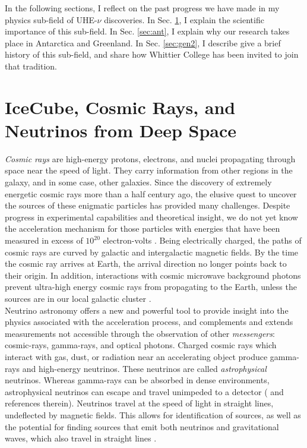 \documentclass[../../../main.tex]{subfiles}
\begin{document}
In the following sections, I reflect on the past progress we have made in my physics sub-field of UHE-$\nu$ discoveries.  In Sec. \ref{sec:space}, I explain the scientific importance of this sub-field.  In Sec. \ref{sec:ant}, I explain why our research takes place in Antarctica and Greenland.  In Sec. \ref{sec:gen2}, I describe give a brief history of this sub-field, and share how Whittier College has been invited to join that tradition.

\section{IceCube, Cosmic Rays, and Neutrinos from Deep Space}
\label{sec:space}

\textit{Cosmic rays} are high-energy protons, electrons, and nuclei propagating through space near the speed of light.  They carry information from other regions in the galaxy, and in some case, other galaxies.  Since the discovery of extremely energetic cosmic rays more than a half century ago, the elusive quest to uncover the sources of these enigmatic particles has provided many challenges.  Despite progress in experimental capabilities and theoretical insight, we do not yet know the acceleration mechanism for those particles with energies that have been measured in excess of $10^{20}$ electron-volts \cite{10.1088/1742-6596/1766/1/012002}.  Being electrically charged, the paths of cosmic rays are curved by galactic and intergalactic magnetic fields.  By the time the cosmic ray arrives at Earth, the arrival direction no longer points back to their origin.  In addition, interactions with cosmic microwave background photons prevent ultra-high energy cosmic rays from propagating to the Earth, unless the sources are in our local galactic cluster \cite{PhysRevLett.16.748} \cite{1966JETPL...4...78Z}.
\\
\vspace{0.25cm}
Neutrino astronomy offers a new and powerful tool to provide insight into the physics associated with the acceleration process, and complements and extends measurements not accessible through the observation of other \textit{messengers}: cosmic-rays, gamma-rays, and  optical photons. Charged cosmic rays which interact with gas, dust, or radiation near an accelerating object produce gamma-rays and high-energy neutrinos.  These neutrinos are called \textit{astrophysical} neutrinos. Whereas gamma-rays can be absorbed in dense environments, astrophysical neutrinos can escape and travel unimpeded to a detector (\cite{Astro2020_1} and references therein). Neutrinos travel at the speed of light in straight lines, undeflected by magnetic fields.  This allows for identification of sources, as well as the potential for finding sources that emit both neutrinos and gravitational waves, which also travel in straight lines \cite{10.3847/2041-8213/ab9d24}.
\end{document}
